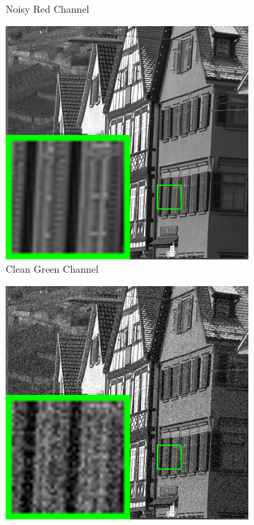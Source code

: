 \begin{figure}
\begin{subfigure}[t]{0.24\textwidth}
		\caption{Noisy Red Channel}
    \end{subfigure}
    \hfill
    \begin{subfigure}[t]{0.24\textwidth}
        \centering
        \includegraphics[width=1\textwidth]{images/mcwnnm/br_kodim08_2.png}
\caption{Clean Green Channel}
    \end{subfigure}
    \hfill
    \begin{subfigure}[t]{0.24\textwidth}
        \centering
        \includegraphics[width=1\textwidth]{images/mcwnnm/br_Noisy_nSig402030_kodim08_2.png}

\end{subfigure}
\end{figure}
